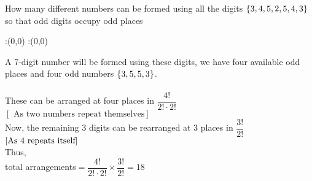 



\question[3] How many different numbers can be formed using all the digits $\lbrace{3,4,5,2,5,4,3}\rbrace$ so that odd digits occupy odd places 


\watchout

\ifprintanswers
  \begin{marginfigure}
      :(0,0)
      :(0,0)
    \figdrawbegin{}
      \figdrawline [100,101]
    \figdrawend
    \figvisu{\figBoxA}{}{%
    }
    \centerline{\box\figBoxA}
  \end{marginfigure}
\fi 

\begin{solution}[\mcq]
A 7-digit number will be formed using these digits, we have four available odd places and four odd numbers $\lbrace{3,5,5,3}\rbrace$.\\
\\
These can be arranged at four places in $\dfrac{4!}{2!\cdot2!}$ $\left[\text{ As two numbers repeat themselves} \right]$\\
Now, the remaining 3 digits can be rearranged at 3 places in $\dfrac{3!}{2!}$ $\left[ \text{As $4$ repeats itself} \right]$\\
Thus,\\
total arrangements$ =\dfrac{4!}{2!\cdot2!} \times \dfrac{3!}{2!} = 18$ 
\end{solution}

